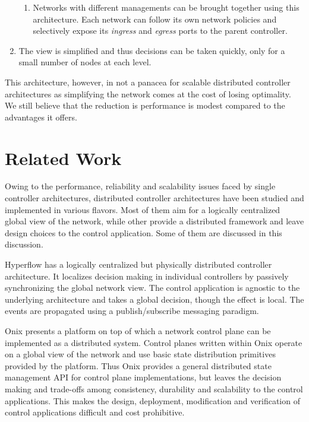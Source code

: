 \documentclass[10pt, twocolumn]{article}
\begin{document}
\begin{enumerate}
\begin{enumerate}
            \item Networks with different managements can be brought together using this architecture. Each network can follow its own network policies and selectively expose its \emph{ingress} and \emph{egress} ports to the parent controller.
        \end{enumerate}
    \item The view is simplified and thus decisions can be taken quickly, only for a small number of nodes at each level.
\end{enumerate}

This architecture, however, in not a panacea for scalable distributed controller architectures as simplifying the network comes at the cost of losing optimality. We still believe that the reduction is performance is modest compared to the advantages it offers.

\section{Related Work}
\label{sec:related}
Owing to the performance, reliability and scalability issues faced by single controller architectures, distributed controller architectures have been studied and implemented in various flavors. Most of them aim for a logically centralized global view of the network, while other provide a distributed framework and leave design choices to the control application. Some of them are discussed in this discussion.

Hyperflow\cite{hyperflow} has a logically centralized but physically distributed controller architecture. It localizes decision making in individual controllers by passively synchronizing the global network view. The control application is agnostic to the underlying architecture and takes a global decision, though the effect is local. The events are propagated using a publish/subscribe messaging paradigm.

Onix\cite{onix} presents a platform on top of which a network control plane can be implemented as a distributed system. Control planes written within Onix operate on a global view of the network and use basic state distribution primitives provided by the platform. Thus Onix provides a general distributed state management API for control plane implementations, but leaves the decision making and trade-offs among consistency, durability and scalability to the control applications. This makes the design, deployment, modification and verification of control applications difficult and cost prohibitive.
\end{document}
